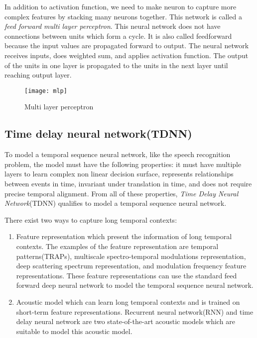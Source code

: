 In addition to activation function, we need to make neuron to capture more complex features by stacking many neurons together. This network is called a \textit{feed forward multi layer perceptron}. This neural network does not have connections between units which form a cycle. It is also called feedforward because the input values are propagated forward to output. The neural network receives inputs, does weighted sum, and applies activation function. The output of the units in one layer is propagated to the units in the next layer until reaching output layer. 

\begin{figure}[H]
\caption{Multi layer perceptron \cite{perceptronImage}}
\texttt{[image: mlp]}
\centering
\end{figure}

\subsection{Time delay neural network(TDNN)}
To model a temporal sequence neural network, like the speech recognition problem, the model must have the following properties: it must have multiple layers to learn complex non linear decision surface, represents relationships between events in time, invariant under translation in time, and does not require precise temporal alignment. From all of these properties, \textit{Time Delay Neural Network}(TDNN) qualifies to model a temporal sequence neural network.

There exist two ways to capture long temporal contexts:
\begin{enumerate}
\item Feature representation which present the information of long temporal contexts. The examples of the feature representation are temporal patterns(TRAPs)\cite{Hermansky99temporalpatterns}, multiscale spectro-temporal modulations representation\cite{Mesgarani04speechdiscrimination}, deep scattering spectrum representation\cite{Anden2014}, and modulation frequency feature representations\cite{Thomas2009}. These feature representations can use the standard feed forward deep neural network to model the temporal sequence neural network.

\item Acoustic model which can learn long temporal contexts and is trained on short-term feature representations. Recurrent neural network(RNN) \cite{1402.1128} and time delay neural network \cite{Waibel:1990:PRU:108235.108263} are two state-of-the-art acoustic models which are suitable to model this acoustic model. 
\end{enumerate}

